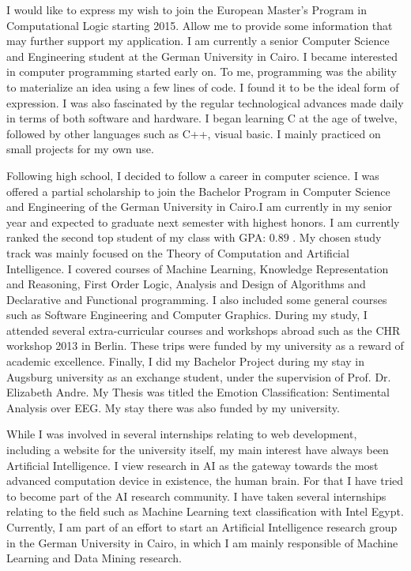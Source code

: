 \documentclass[10pt,stdletter,dateno,sigleft]{newlfm} %
\begin{document}
\begin{newlfm}


  I would like to express my wish to join the European Master's Program in
  Computational Logic starting 2015.
  Allow me to provide some information that may further support my application.
  I am currently a senior Computer Science and Engineering student at the German
  University in Cairo.  I became interested in computer programming started
  early on. To me, programming was the ability to  materialize an idea
  using a few lines of code. I found it to be the ideal form of expression. I
  was also fascinated by the regular technological advances made daily in terms
  of both software and hardware. I began learning C at the age of twelve,
  followed by other languages such as C++, visual basic. I mainly practiced on
  small projects for my own use.  

  Following high school, I decided to follow a career in computer science. I was
  offered a partial scholarship to join the Bachelor Program in Computer Science
  and Engineering of the German University in Cairo.I am currently in my senior
  year and expected to graduate next semester with highest honors. I am
  currently ranked the second top student of my class with GPA: $0.89$ . My
  chosen study track was mainly focused on the Theory of Computation and
  Artificial Intelligence. I covered courses of Machine Learning, Knowledge
  Representation and Reasoning, First Order Logic, Analysis and Design of
  Algorithms and Declarative and Functional
  programming. I also included some general courses such as Software Engineering
  and Computer Graphics. During my study, I attended several extra-curricular courses and
  workshops abroad such as the CHR workshop 2013 in Berlin. These trips were
  funded by my university as a reward of academic excellence. Finally, I did my
  Bachelor Project during my stay in Augsburg university as an exchange student,
  under the supervision of Prof. Dr. Elizabeth Andre. My Thesis was titled the
  Emotion Classification: Sentimental Analysis over EEG. My stay there was also
  funded by my university.

  While I was involved in several internships relating to web development,
  including a website for the university itself, my main interest have always
  been Artificial Intelligence. I view research in AI as the gateway towards the
  most advanced computation device in existence, the human brain. For that I have
  tried to become part of the AI research community. I have taken several
  internships relating to the field such as Machine Learning text classification
  with Intel Egypt. Currently, I am part of an effort to start an Artificial
  Intelligence research group in the German University in Cairo, in which I am
  mainly responsible of Machine Learning and Data Mining research.
  

\end{newlfm}
\end{document}
